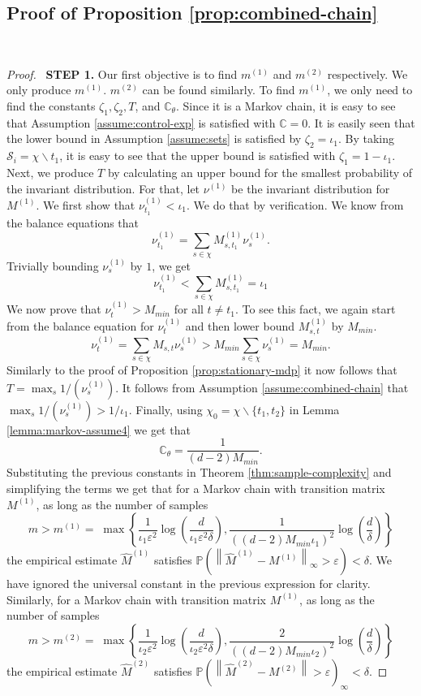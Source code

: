 \documentclass[opre,sglanonrev]{informs4}
\numberwithin{equation}{section}
\newcommand{\pow}[1]{^{(#1)}}
\newcommand{\lp}{\left(}
\newcommand{\rp}{\right)}
\newcommand{\lV}{\left\|}
\newcommand{\rV}{\right\|}
\newcommand{\Cbb}{\mathbb{C}}
\newcommand{\Pbb}{\mathbb{P}}
\newcommand{\Scal}{\mathcal{S}}
\newcommand{\constant}{\Cbb}
\newcommand{\prob}{\Pbb}
\newcommand{\eps}{\varepsilon}
\renewcommand{\epsilon}{\eps}
\begin{document}
\begin{APPENDICES}
\subsection{Proof of Proposition \ref{prop:combined-chain}}~\label{sec:prf-combchn}

\begin{proof}\
\textbf{STEP 1.}
Our first objective is to find $m\pow 1$ and $m\pow 2$ respectively. We only produce $m\pow 1$. $m\pow 2$ can be found similarly. To find $m\pow 1$, we only need to find the constants $\zeta_1,\zeta_2,T$, and $\constant_\theta$. Since it is a Markov chain, it is easy to see that Assumption \ref{assume:control-exp} is satisfied with $\constant=0$. It is easily seen that the lower bound in Assumption \ref{assume:sets} is satisfied by $\zeta_2 = \iota_1$. By taking $\Scal_i=\chi\backslash t_1$, it is easy to see that the upper bound is satisfied with $\zeta_1=1-\iota_1$. Next, we produce $T$ by calculating an upper bound for the smallest probability of the invariant distribution. For that, let $\nu\pow 1$ be the invariant distribution for $M\pow 1$. We first show that $\nu_{t_1}\pow 1<\iota_1$. We do that by verification. We know from the balance equations that
\[
\nu_{t_1}\pow 1 = \sum_{s\in\chi} M_{s,t_1}\pow 1\nu_{s}\pow 1.
\]
Trivially bounding $\nu_s\pow 1$ by $1$, we get
\[
\nu_{t_1}\pow 1 < \sum_{s\in\chi} M_{s,t_1}\pow 1 = \iota_1
\]
We now prove that $\nu_{t}\pow 1>M_{min}$ for all $t\neq t_1$. To see this fact, we again start from the balance equation for $\nu_{t}\pow 1$ and then lower bound $M_{s,t}\pow 1$ by $M_{min}$. 
\[
\nu_{t}\pow 1 =  \sum_{s\in\chi} M_{s,t}\nu_{s}\pow 1>M_{min}\sum_{s\in \chi}\nu_{s}\pow 1=M_{min}.
\]
Similarly to the proof of Proposition \ref{prop:stationary-mdp} it now follows that $T=\max_s 1/\lp \nu_s\pow 1\rp$. It follows from Assumption \ref{assume:combined-chain} that $\max_s 1/\lp \nu_s\pow 1\rp>1/\iota_1$.
Finally, using $\chi_0=\chi\backslash\{t_1,t_2\}$ in Lemma \ref{lemma:markov-assume4} we get that 
\[
\constant_\theta = \frac{1}{(d-2)M_{min}}.
\]
Substituting the previous constants in Theorem \ref{thm:sample-complexity} and simplifying the terms we get that for a Markov chain with transition matrix $M\pow 1$, as long as the number of samples 
\[
m>m\pow 1 = \; \max\left\{\frac{1}{\iota_1\eps^2}\log\lp \frac{d}{\iota_1\epsilon^2\delta} \rp, \frac{1}{\lp(d-2)M_{min}\iota_1\rp^2}\log\lp \frac{d}{\delta} \rp\right\}
\]
the empirical estimate $\hat M\pow 1$ satisfies $\prob\lp\lV\hat M\pow 1-M\pow 1\rV_\infty>\epsilon\rp<\delta$. We have ignored the universal constant in the previous expression for clarity.
Similarly, for a Markov chain with transition matrix $M\pow 1$, as long as the number of samples 
\[
m>m\pow 2 = \; \max\left\{\frac{1}{\iota_2\eps^2}\log\lp \frac{d}{\iota_2\epsilon^2\delta} \rp, \frac{2}{\lp(d-2)M_{min}\iota_2\rp^2}\log\lp \frac{d}{\delta} \rp\right\}
\]
the empirical estimate $\hat M\pow 2$ satisfies $\prob\lp\lV\hat M\pow 2-M\pow 2\rV>\epsilon\rp_\infty<\delta$. 


\end{proof}
\end{APPENDICES}
\end{document}
